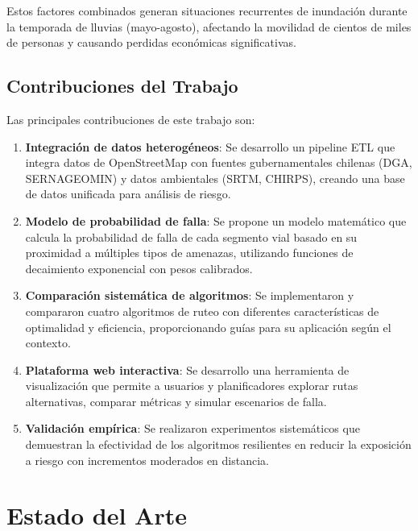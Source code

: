 \documentclass[conference]{IEEEtran}
\begin{document}
Estos factores combinados generan situaciones recurrentes de inundación durante la temporada de lluvias (mayo-agosto), afectando la movilidad de cientos de miles de personas y causando perdidas económicas significativas.

\subsection{Contribuciones del Trabajo}

Las principales contribuciones de este trabajo son:

\begin{enumerate}
    \item \textbf{Integración de datos heterogéneos}: Se desarrollo un pipeline ETL que integra datos de OpenStreetMap con fuentes gubernamentales chilenas (DGA, SERNAGEOMIN) y datos ambientales (SRTM, CHIRPS), creando una base de datos unificada para análisis de riesgo.

    \item \textbf{Modelo de probabilidad de falla}: Se propone un modelo matemático que calcula la probabilidad de falla de cada segmento vial basado en su proximidad a múltiples tipos de amenazas, utilizando funciones de decaimiento exponencial con pesos calibrados.

    \item \textbf{Comparación sistemática de algoritmos}: Se implementaron y compararon cuatro algoritmos de ruteo con diferentes características de optimalidad y eficiencia, proporcionando guías para su aplicación según el contexto.

    \item \textbf{Plataforma web interactiva}: Se desarrollo una herramienta de visualización que permite a usuarios y planificadores explorar rutas alternativas, comparar métricas y simular escenarios de falla.

    \item \textbf{Validación empírica}: Se realizaron experimentos sistemáticos que demuestran la efectividad de los algoritmos resilientes en reducir la exposición a riesgo con incrementos moderados en distancia.
\end{enumerate}

\section{Estado del Arte}
\end{document}
